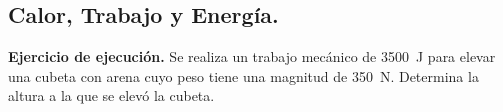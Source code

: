 \documentclass[12pt, letter]{exam}
\begin{document}
\begin{questions}

    

    \setcounter{section}{11}

    \section{Calor, Trabajo y Energía.}

    \setcounter{question}{29} \question \textbf{Ejercicio de ejecución.} Se realiza un trabajo mecánico de \SI{3500}{\joule} para elevar una cubeta con arena cuyo peso tiene una magnitud de \SI{350}{\newton}. Determina la altura a la que se elevó la cubeta.


\end{questions}
\end{document}
